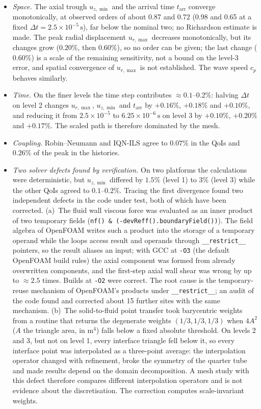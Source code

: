 \begin{itemize}
	\item \emph{Space.} The axial trough $u_{z,\min}$ and the arrival time $t_\mathrm{arr}$ converge monotonically, at observed orders of about 0.87 and 0.72 (0.98 and 0.65 at a fixed $\Delta t = 2.5\times10^{-5}\,\mathrm{s}$), far below the nominal two; no Richardson estimate is made. The peak radial displacement $u_{r,\max}$ decreases monotonically, but its changes grow ($0.20\%$, then $0.60\%$), so no order can be given; the last change ($0.60\%$) is a scale of the remaining sensitivity, not a bound on the level-3 error, and spatial convergence of $u_{r,\max}$ is not established. The wave speed $c_p$ behaves similarly.
	\item \emph{Time.} On the finer levels the time step contributes $\approx0.1$--$0.2\%$: halving $\Delta t$ on level 2 changes $u_{r,\max}$, $u_{z,\min}$ and $t_\mathrm{arr}$ by $+0.16\%$, $+0.18\%$ and $+0.10\%$, and reducing it from $2.5\times10^{-5}$ to $6.25\times10^{-6}\,\mathrm{s}$ on level 3 by $+0.10\%$, $+0.20\%$ and $+0.17\%$. The scaled path is therefore dominated by the mesh.
	\item \emph{Coupling.} Robin--Neumann and IQN-ILS agree to $0.07\%$ in the QoIs and $0.26\%$ of the peak in the histories.
	\item \emph{Two solver defects found by verification.} On two platforms the calculations were deterministic, but $u_{z,\min}$ differed by $1.5\%$ (level 1) to $3\%$ (level 3) while the other QoIs agreed to $0.1$--$0.2\%$. Tracing the first divergence found two independent defects in the code under test, both of which have been corrected.
	(a)~The fluid wall viscous force was evaluated as an inner product of two temporary fields (\texttt{nf() \& (-devReff().boundaryField())}). The field algebra of OpenFOAM writes such a product into the storage of a temporary operand while the loops access result and operands through \texttt{\_\_restrict\_\_} pointers, so the result aliases an input; with GCC at \texttt{-O3} (the default OpenFOAM build rules) the axial component was formed from already overwritten components, and the first-step axial wall shear was wrong by up to $\approx2.5$ times. Builds at \texttt{-O2} were correct. The root cause is the temporary-reuse mechanism of OpenFOAM's products under \texttt{\_\_restrict\_\_}; an audit of the code found and corrected about 15 further sites with the same mechanism.
	(b)~The solid-to-fluid point transfer took barycentric weights from a routine that returns the degenerate weights $(1/3, 1/3, 1/3)$ when $4A^2$ ($A$ the triangle area, in $\mathrm{m}^4$) falls below a fixed absolute threshold. On levels 2 and 3, but not on level 1, every interface triangle fell below it, so every interface point was interpolated as a three-point average: the interpolation operator changed with refinement, broke the symmetry of the quarter tube and made results depend on the domain decomposition. A mesh study with this defect therefore compares different interpolation operators and is not evidence about the discretisation. The correction computes scale-invariant weights.

\end{itemize}
